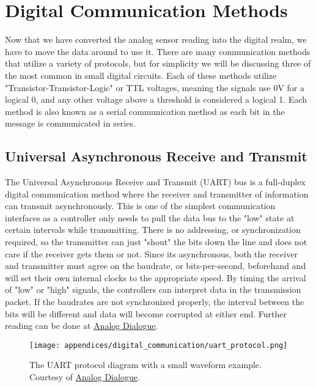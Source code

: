 \chapter{Digital Communication Methods} 
Now that we have converted the analog sensor reading into the digital realm, we have to move the data around to use it.
There are many communication methods that utilize a variety of protocols, but for simplicity we will be discussing three of the most common in small digital circuits.
Each of these methods utilize "Transistor-Transistor-Logic" or TTL voltages, meaning the signals use 0V for a logical 0, and any other voltage above a threshold is considered a logical 1.
Each method is also known as a serial communication method as each bit in the message is communicated in series.

\section[UART Explained]{Universal Asynchronous Receive and Transmit} 
The Universal Asynchronous Receive and Transmit (UART) bus is a full-duplex digital communication method where the receiver and transmitter of information can transmit asynchronously. 
This is one of the simplest communication interfaces as a controller only needs to pull the data bus to the "low" state at certain intervals while transmitting.
There is no addressing, or synchronization required, so the transmitter can just "shout" the bits down the line and does not care if the receiver gets them or not.
Since its asynchronous, both the receiver and transmitter must agree on the baudrate, or bits-per-second, beforehand and will set their own internal clocks to the appropriate speed.
By timing the arrival of "low" or "high" signals, the controllers can interpret data in the transmission packet.
If the baudrates are not synchronized properly, the interval between the bits will be different and data will become corrupted at either end.
Further reading can be done at \href{https://www.analog.com/en/analog-dialogue/articles/uart-a-hardware-communication-protocol.html}{Analog Dialogue}.

\begin{figure}[h!]
    \caption[UART protocol diagram]{The UART protocol diagram with a small waveform example. 
    Courtesy of \href{https://www.analog.com/en/analog-dialogue/articles/uart-a-hardware-communication-protocol.html}{Analog Dialogue}.}
    \centering
    \texttt{[image: appendices/digital\_communication/uart\_protocol.png]}
\end{figure}


